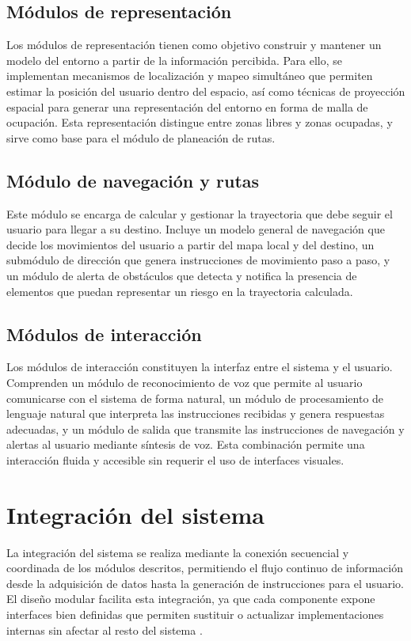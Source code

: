 \subsection{Módulos de representación}

Los módulos de representación tienen como objetivo construir y mantener un modelo del entorno a partir de la información percibida. Para ello, se implementan mecanismos de localización y mapeo simultáneo que permiten estimar la posición del usuario dentro del espacio, así como técnicas de proyección espacial para generar una representación del entorno en forma de malla de ocupación. Esta representación distingue entre zonas libres y zonas ocupadas, y sirve como base para el módulo de planeación de rutas.

\subsection{Módulo de navegación y rutas}

Este módulo se encarga de calcular y gestionar la trayectoria que debe seguir el usuario para llegar a su destino. Incluye un modelo general de navegación que decide los movimientos del usuario a partir del mapa local y del destino, un submódulo de dirección que genera instrucciones de movimiento paso a paso, y un módulo de alerta de obstáculos que detecta y notifica la presencia de elementos que puedan representar un riesgo en la trayectoria calculada.

\subsection{Módulos de interacción}

Los módulos de interacción constituyen la interfaz entre el sistema y el usuario. Comprenden un módulo de reconocimiento de voz que permite al usuario comunicarse con el sistema de forma natural, un módulo de procesamiento de lenguaje natural que interpreta las instrucciones recibidas y genera respuestas adecuadas, y un módulo de salida que transmite las instrucciones de navegación y alertas al usuario mediante síntesis de voz. Esta combinación permite una interacción fluida y accesible sin requerir el uso de interfaces visuales.

\section{Integración del sistema}

La integración del sistema se realiza mediante la conexión secuencial y coordinada de los módulos descritos, permitiendo el flujo continuo de información desde la adquisición de datos hasta la generación de instrucciones para el usuario. El diseño modular facilita esta integración, ya que cada componente expone interfaces bien definidas que permiten sustituir o actualizar implementaciones internas sin afectar al resto del sistema \cite{bass2012software}.

